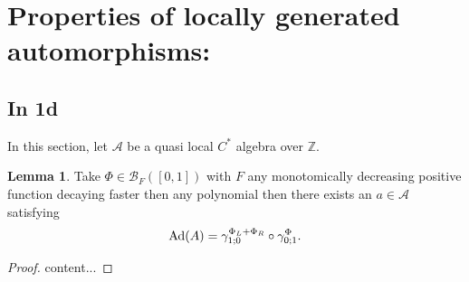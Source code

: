 \documentclass[12pt,a4paper,twoside]{article}
\let\originalleft\left
\let\originalright\right
\renewcommand{\left}{\mathopen{}\mathclose\bgroup\originalleft}
\renewcommand{\right}{\aftergroup\egroup\originalright}
\newcommand{\BB}{\mathcal B}
\newcommand{\ZZ}{\mathbb Z}
\renewcommand{\AA}{\mathcal A}
\newcommand{\Ad}[1]{\textrm{Ad}\left(#1\right)}
\theoremstyle{definition}
\newtheorem{lemma}[theorem]{Lemma}
\numberwithin{equation}{section}
\begin{document}
\section{Properties of locally generated automorphisms:}
\subsection{In 1d}
In this section, let $\AA$ be a quasi local $C^*$ algebra over $\ZZ$.
\begin{lemma}\label{lem:PropertiesLocallyGeneratedAutomorphisms1d}
	Take $\Phi\in\BB_{F}([0,1])$ with $F$ any monotomically decreasing positive function decaying faster then any polynomial then there exists an $a\in\AA$ satisfying
	\begin{equation}
		\Ad{A}=\gamma^{\Phi_L+\Phi_R}_{1;0}\circ\gamma^\Phi_{0;1}.
	\end{equation}
\end{lemma}
\begin{proof}
	content...
\end{proof}
\end{document}
